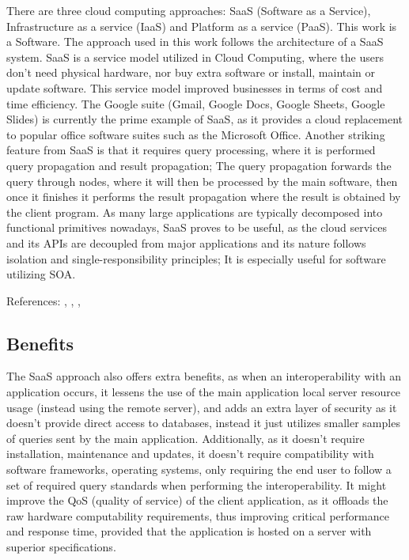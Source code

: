 There are three cloud computing approaches: SaaS (Software as a Service), Infrastructure as a service (IaaS) and Platform as a service (PaaS). This work is a Software.
The approach used in this work follows the architecture of a SaaS system. SaaS is a service model utilized in Cloud Computing, where the users don’t need physical hardware, nor buy extra software or install, maintain or update software. This service model improved businesses in terms of cost and time efficiency. The Google suite (Gmail, Google Docs, Google Sheets, Google Slides) is currently the prime example of SaaS, as it provides a cloud replacement to popular office software suites such as the Microsoft Office. 
Another striking feature from SaaS is that it requires query processing, where it is performed query propagation and result propagation; The query propagation forwards the query through nodes, where it will then be processed by the main software, then once it finishes it performs the result propagation where the result is obtained by the client program.
As many large applications are typically decomposed into functional primitives nowadays, SaaS proves to be useful, as the cloud services and its APIs are decoupled from major applications and its nature follows isolation and single-responsibility principles; It is especially useful for software utilizing SOA.

References:  , , , 

\subsection{Benefits}
\acresetall

The SaaS approach also offers extra benefits, as when an interoperability with an application occurs, it lessens the use of the main application local server resource usage (instead using the remote server), and adds an extra layer of security as it doesn’t provide direct access to databases, instead it just utilizes smaller samples of queries sent by the main application. Additionally, as it doesn’t require installation, maintenance and updates, it doesn’t require compatibility with software frameworks, operating systems, only requiring the end user to follow a set of required query standards when performing the interoperability. It might improve the QoS (quality of service) of the client application, as it offloads the raw hardware computability requirements, thus improving critical performance and response time, provided that the application is hosted on a server with superior specifications.

